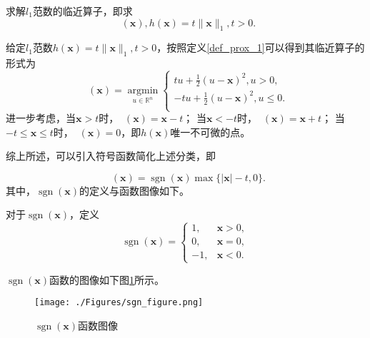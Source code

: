 \begin{problem}\label{exp_prox_1}
    求解$l_{1}$范数的临近算子，即求
    \begin{equation}
        \mathop{\mathrm{prox_{h}}}(\bm{x}), h(\bm{x})=t\|\bm{x}\|_{1}, t > 0.
        \nonumber
    \end{equation}
\end{problem}
\begin{solution}
    给定$l_{1}$范数$h(\bm{x})=t\|\bm{x}\|_{1}, t>0$，按照定义\ref{def_prox_1}可以得到其临近算子的形式为
    \begin{equation}
        \mathop{\mathrm{prox_{h}}}(\bm{x}) = \mathop{\mathrm{argmin}}\limits_{u\in \mathbb{R}^{n}}
        \begin{cases}
            tu + \frac{1}{2}(u-\bm{x})^{2}, u>0      ,\\
            -tu + \frac{1}{2}(u-\bm{x})^{2}, u\leq 0 .\\
        \end{cases}
    \end{equation}
    进一步考虑，当$\bm{x}>t$时，$\mathop{\mathrm{prox_{h}}}(\bm{x}) = \bm{x}-t$；
    当$\bm{x}<-t$时，$\mathop{\mathrm{prox_{h}}}(\bm{x}) = \bm{x}+t$；
    当$-t\leq \bm{x}\leq t$时，$\mathop{\mathrm{prox_{h}}}(\bm{x}) = 0$，即$h(\bm{x})$唯一不可微的点。

    综上所述，可以引入符号函数简化上述分类，即
    
    \begin{equation}
        \mathop{\mathrm{prox_{h}}}(\bm{x}) = \mathop{\mathrm{sgn}}(\bm{x})\max\{|\bm{x}|-t, 0\}.
        \label{eq_prox_3}
    \end{equation}
    其中，$\mathop{\mathrm{sgn}}(\bm{x})$的定义与函数图像如下。
    \begin{definition}
        对于$\mathop{\mathrm{sgn}}(\bm{x})$，定义
        \begin{equation}
            \mathop{\mathrm{sgn}}(\bm{x}) = 
            \begin{cases}
                1, &\bm{x} > 0, \\
                0, &\bm{x} = 0, \\
                -1, &\bm{x} < 0.
            \end{cases}
        \end{equation}
    \end{definition}

    $\mathop{\mathrm{sgn}}(\bm{x})$函数的图像如下图\ref{figure_sgn}所示。
    \begin{figure}[hbtp]
        \centering
        \texttt{[image: ./Figures/sgn\_figure.png]}
        \caption{$\mathop{\mathrm{sgn}}(\bm{x})$函数图像}
        \label{figure_sgn}
    \end{figure}
\end{solution}

